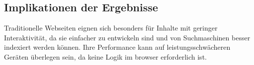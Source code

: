 
\subsection{Implikationen der Ergebnisse}
Traditionelle Webseiten eignen sich besonders für Inhalte mit geringer Interaktivität, da sie einfacher zu entwickeln sind und von Suchmaschinen besser indexiert werden können.
Ihre Performance kann auf leistungsschwächeren Geräten überlegen sein, da keine Logik im \gls{browser} erforderlich ist.

